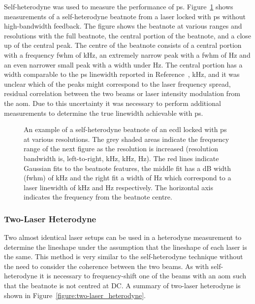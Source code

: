 Self-heterodyne was used to measure the performance of \gls{ps}.
Figure~\ref{figure:self-heterodyne_example} shows measurements of a self-heterodyne beatnote from a laser locked with \gls{ps} without high-bandwidth feedback.
The figure shows the beatnote at various ranges and resolutions with the full beatnote, the central portion of the beatnote, and a close up of the central peak.
The centre of the beatnote consists of a central portion with a frequency \gls{fwhm} of \unit[33]{kHz}, an extremely narrow peak with a \gls{fwhm} of \unit[240]{Hz} and an even narrower small peak with a width under \unit[100]{Hz}.
The central portion has a width comparable to the \gls{ps} linewidth reported in Reference~\cite{torii_laser-phase_2012}, \unit[20]{kHz}, and it was unclear which of the peaks might correspond to the laser frequency spread, residual correlation between the two beams or laser intensity modulation from the \gls{aom}.
Due to this uncertainty it was necessary to perform additional measurements to determine the true linewidth achievable with \gls{ps}.

\begin{figure}
\center

\caption[Example self-heterodyne beatnote.]{An example of a self-heterodyne beatnote of an \gls{ecdl} locked with \gls{ps} at various resolutions.
The grey shaded areas indicate the frequency range of the next figure as the resolution is increased (resolution bandwidth is, left-to-right, \unit[3]{kHz}, \unit[1]{kHz}, \unit[1]{Hz}).
The red lines indicate Gaussian fits to the beatnote features, the middle fit has a \unit[-3]{dB} width (\gls{fwhm}) of \unit[77]{kHz} and the right fit a width of \unit[570]{Hz} which correspond to a laser linewidth of \unit[33]{kHz} and \unit[240]{Hz} respectively.
The horizontal axis indicates the frequency from the beatnote centre.}
\label{figure:self-heterodyne_example}
\end{figure}

\subsubsection{Two-Laser Heterodyne}\label{section:two-laser_heterodyen}

Two almost identical laser setups can be used in a heterodyne measurement to determine the lineshape under the assumption that the lineshape of each laser is the same.
This method is very similar to the self-heterodyne technique without the need to consider the coherence between the two beams.
As with self-heterodyne it is necessary to frequency-shift one of the beams with an \gls{aom} such that the beatnote is not centred at DC.
A summary of two-laser heterodyne is shown in Figure~\ref{figure:two-laser_heterodyne}.

